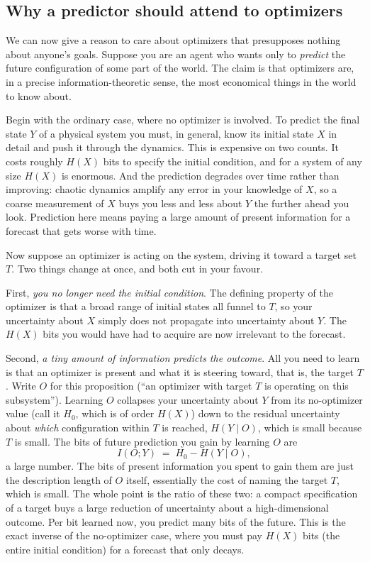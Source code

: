 \documentclass[10pt]{article}
\theoremstyle{definition}
\theoremstyle{remark}
\begin{document}
\subsection{Why a predictor should attend to optimizers}
\label{sec:prediction}

We can now give a reason to care about optimizers that presupposes nothing about anyone's goals. Suppose you are an agent who wants only to \emph{predict} the future configuration of some part of the world. The claim is that optimizers are, in a precise information-theoretic sense, the most economical things in the world to know about.

Begin with the ordinary case, where no optimizer is involved. To predict the final state $Y$ of a physical system you must, in general, know its initial state $X$ in detail and push it through the dynamics. This is expensive on two counts. It costs roughly $H(X)$ bits to specify the initial condition, and for a system of any size $H(X)$ is enormous. And the prediction degrades over time rather than improving: chaotic dynamics amplify any error in your knowledge of $X$, so a coarse measurement of $X$ buys you less and less about $Y$ the further ahead you look. Prediction here means paying a large amount of present information for a forecast that gets worse with time.

Now suppose an optimizer is acting on the system, driving it toward a target set $T$. Two things change at once, and both cut in your favour.

First, \emph{you no longer need the initial condition}. The defining property of the optimizer is that a broad range of initial states all funnel to $T$, so your uncertainty about $X$ simply does not propagate into uncertainty about $Y$. The $H(X)$ bits you would have had to acquire are now irrelevant to the forecast.

Second, \emph{a tiny amount of information predicts the outcome}. All you need to learn is that an optimizer is present and what it is steering toward, that is, the target $T$. Write $O$ for this proposition (``an optimizer with target $T$ is operating on this subsystem''). Learning $O$ collapses your uncertainty about $Y$ from its no-optimizer value (call it $H_0$, which is of order $H(X)$) down to the residual uncertainty about \emph{which} configuration within $T$ is reached, $H(Y \mid O)$, which is small because $T$ is small. The bits of future prediction you gain by learning $O$ are
\[
I(O; Y) \;=\; H_0 - H(Y \mid O),
\]
a large number. The bits of present information you spent to gain them are just the description length of $O$ itself, essentially the cost of naming the target $T$, which is small. The whole point is the ratio of these two: a compact specification of a target buys a large reduction of uncertainty about a high-dimensional outcome. Per bit learned now, you predict many bits of the future. This is the exact inverse of the no-optimizer case, where you must pay $H(X)$ bits (the entire initial condition) for a forecast that only decays.
\end{document}
